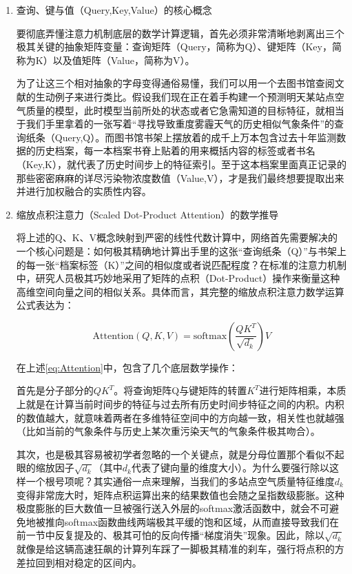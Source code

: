 \begin{enumerate}[label=（\arabic*）, leftmargin=0pt, itemindent=4.5em, labelsep=0.5em, listparindent=2em, parsep=0pt]

    \item 查询、键与值（Query,Key,Value）的核心概念

    要彻底弄懂注意力机制底层的数学计算逻辑，首先必须非常清晰地剥离出三个极其关键的抽象矩阵变量：查询矩阵（Query，简称为Q）、键矩阵（Key，简称为K）以及值矩阵（Value，简称为V）。
    
    为了让这三个相对抽象的字母变得通俗易懂，我们可以用一个去图书馆查阅文献的生动例子来进行类比。假设我们现在正在着手构建一个预测明天某站点空气质量的模型，此时模型当前所处的状态或者它急需知道的目标特征，就相当于我们手里拿着的一张写着“寻找导致重度雾霾天气的历史相似气象条件”的查询纸条（Query,Q）。而图书馆书架上摆放着的成千上万本包含过去十年监测数据的历史档案，每一本档案书脊上贴着的用来概括内容的标签或者书名（Key,K），就代表了历史时间步上的特征索引。至于这本档案里面真正记录的那些密密麻麻的详尽污染物浓度数值（Value,V），才是我们最终想要提取出来并进行加权融合的实质性内容。

    \item 缩放点积注意力（Scaled Dot-Product Attention）的数学推导
    
    将上述的Q、K、V概念映射到严密的线性代数计算中，网络首先需要解决的一个核心问题是：如何极其精确地计算出手里的这张“查询纸条（Q）”与书架上的每一张“档案标签（K）”之间的相似度或者说匹配程度？在标准的注意力机制中，研究人员极其巧妙地采用了矩阵的点积（Dot-Product）操作来衡量这种高维空间向量之间的相似关系。具体而言，其完整的缩放点积注意力数学运算公式表达为：

    \begin{equation}\label{eq:Attention}
        \text{Attention}(Q, K, V) = \text{softmax}\left( \frac{QK^T}{\sqrt{d_k}} \right) V
    \end{equation}

    在上述\cref{eq:Attention}中，包含了几个底层数学操作：

    首先是分子部分的$QK^T$。将查询矩阵Q与键矩阵的转置$K^T$进行矩阵相乘，本质上就是在计算当前时间步的特征与过去所有历史时间步特征之间的内积。内积的数值越大，就意味着两者在多维特征空间中的方向越一致，相关性也就越强（比如当前的气象条件与历史上某次重污染天气的气象条件极其吻合）。

    其次，也是极其容易被初学者忽略的一个关键点，就是分母位置那个看似不起眼的缩放因子$\sqrt{d_k}$（其中$d_k$代表了键向量的维度大小）。为什么要强行除以这样一个根号项呢？其实通俗一点来理解，当我们的多站点空气质量特征维度$d_k$变得非常庞大时，矩阵点积运算出来的结果数值也会随之呈指数级膨胀。这种极度膨胀的巨大数值一旦被强行送入外层的softmax激活函数中，就会不可避免地被推向softmax函数曲线两端极其平缓的饱和区域，从而直接导致我们在前一节中反复提及的、极其可怕的反向传播“梯度消失”现象。因此，除以$\sqrt{d_k}$就像是给这辆高速狂飙的计算列车踩了一脚极其精准的刹车，强行将点积的方差拉回到相对稳定的区间内。


\end{enumerate}
